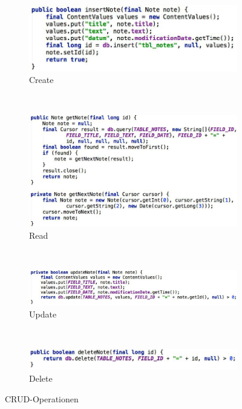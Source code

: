 \begin{figure}
	\centering
	\begin{subfigure}[b]{0.48\textwidth}
		\includegraphics[width=\textwidth]{fig/sqlite-create}
		\caption{Create}
	\end{subfigure}
	~
	\begin{subfigure}[b]{0.48\textwidth}
		\includegraphics[width=\textwidth]{fig/sqlite-read}
		\caption{Read}
	\end{subfigure}
	~
	\begin{subfigure}[b]{0.48\textwidth}
		\includegraphics[width=\textwidth]{fig/sqlite-update}
		\caption{Update}
	\end{subfigure}
	~
	\begin{subfigure}[b]{0.48\textwidth}
		\includegraphics[width=\textwidth]{fig/sqlite-delete}
		\caption{Delete}
	\end{subfigure}
	\caption{CRUD-Operationen}
	\label{fig:crud-operationen}
\end{figure}
